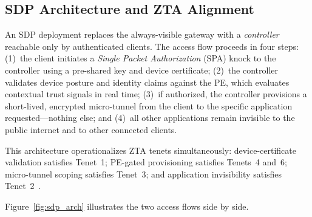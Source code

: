 \documentclass[sigconf,nonacm]{acmart}
\begin{document}
\subsection{SDP Architecture and ZTA Alignment}

An SDP deployment replaces the always-visible gateway with a \emph{controller}
reachable only by authenticated clients. The access flow proceeds in four steps:
(1)~the client initiates a \emph{Single Packet Authorization} (SPA) knock to
the controller using a pre-shared key and device certificate; (2)~the controller
validates device posture and identity claims against the PE, which evaluates
contextual trust signals in real time; (3)~if authorized, the controller
provisions a short-lived, encrypted micro-tunnel from the client to the specific
application requested---nothing else; and (4)~all other applications remain
invisible to the public internet and to other connected clients.

This architecture operationalizes ZTA tenets simultaneously: device-certificate
validation satisfies Tenet~1; PE-gated provisioning satisfies Tenets~4 and~6;
micro-tunnel scoping satisfies Tenet~3; and application invisibility satisfies
Tenet~2~\cite{nist800207,csa_sdp2023}.

Figure~\ref{fig:sdp_arch} illustrates the two access flows side by side.
\end{document}
